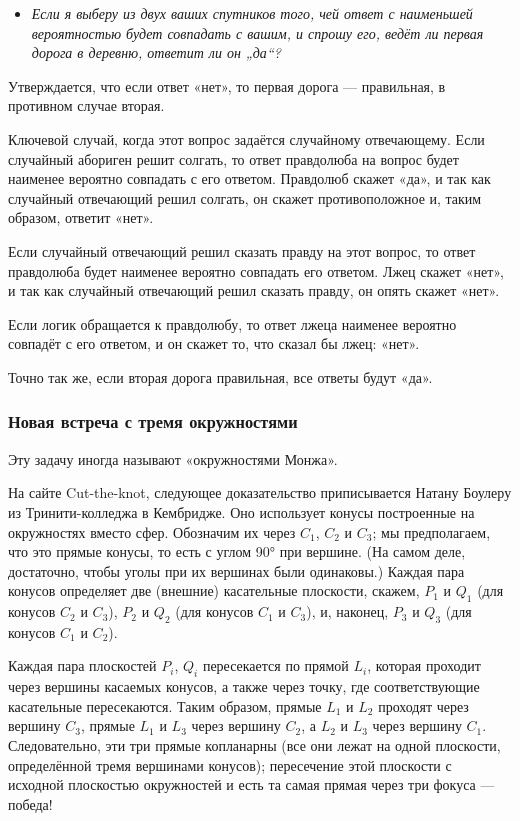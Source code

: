 \begin{itemize}
 \item[] \emph{Если я выберу из двух ваших спутников того, чей ответ с наименьшей вероятностью будет совпадать с вашим, и спрошу его, ведёт ли первая дорога в деревню, ответит ли он „да“?}
\end{itemize}

Утверждается, что если ответ «нет», то первая дорога --- правильная, в противном случае вторая.

Ключевой случай, когда этот вопрос задаётся случайному отвечающему.
Если случайный абориген решит солгать, то ответ правдолюба на вопрос будет наименее вероятно совпадать с его ответом.
Правдолюб скажет «да», и так как случайный отвечающий решил солгать, он скажет противоположное и, таким образом, ответит «нет».

Если случайный отвечающий решил сказать правду на этот вопрос, то ответ правдолюба будет наименее вероятно совпадать его ответом.
Лжец скажет «нет», и так как случайный отвечающий решил сказать правду, он опять скажет «нет».

Если логик обращается к правдолюбу, то ответ лжеца наименее вероятно совпадёт с его ответом,
и он скажет то, что сказал бы лжец: «нет».

Точно так же, если вторая дорога правильная, все ответы будут «да».

\subsubsection*{Новая встреча с тремя окружностями}

Эту задачу иногда называют «окружностями Монжа».

На сайте Cut-the-knot, следующее доказательство приписывается Натану Боулеру из Тринити-колледжа в Кембридже.
Оно использует конусы построенные на окружностях вместо сфер.
Обозначим их через $C_1$, $C_2$ и $C_3$; мы предполагаем, что это прямые конусы, то есть с углом 90° при вершине.
(На самом деле, достаточно, чтобы уголы при их вершинах были одинаковы.)
Каждая пара конусов определяет две (внешние) касательные плоскости, скажем, $P_1$ и $Q_1$ (для конусов $C_2$ и $C_3$), $P_2$ и $Q_2$ (для конусов $C_1$ и $C_3$), и, наконец, $P_3$ и $Q_3$ (для конусов $C_1$ и $C_2$).

Каждая пара плоскостей $P_i$, $Q_i$ пересекается по прямой $L_i$, которая проходит через вершины касаемых конусов, а также через точку, где соответствующие касательные пересекаются.
Таким образом, прямые $L_1$ и $L_2$ проходят через вершину $C_3$,
прямые $L_1$ и $L_3$ через вершину $C_2$,
а $L_2$ и $L_3$ через вершину $C_1$.
Следовательно, эти три прямые копланарны (все они лежат на одной плоскости, определённой тремя вершинами конусов); пересечение этой плоскости с исходной плоскостью окружностей и есть та самая прямая через три фокуса --- победа!

